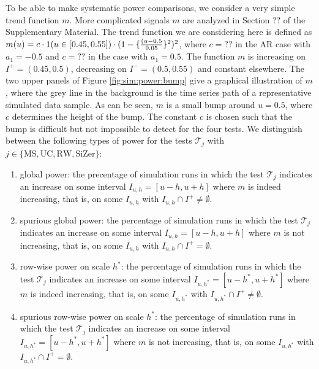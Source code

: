 To be able to make systematic power comparisons, we consider a very simple trend function $m$. More complicated signals $m$ are analyzed in Section ?? of the Supplementary Material. The trend function we are considering here is defined as $m(u) = c \cdot 1(u \in [0.45,0.55]) \cdot (1 - \{\frac{(u-0.5}{0.05}\}^2)^2$, where $c = ??$ in the AR case with $a_1 = -0.5$ and $c=??$ in the case with $a_1=0.5$. The function $m$ is increasing on $I^{+} = (0.45,0.5)$, decreasing on $I^{-} = (0.5,0.55)$ and constant elsewhere. The two upper panels of Figure \ref{fig:sim:power:bump} give a graphical illustration of $m$, where the grey line in the background is the time series path of a representative simulated data sample. As can be seen, $m$ is a small bump around $u=0.5$, where $c$ determines the height of the bump. The constant $c$ is chosen such that the bump is difficult but not impossible to detect for the four tests. We distinguish between the following types of power for the tests $\mathcal{T}_j$ with $j \in \{ \text{MS}, \text{UC}, \text{RW}, \text{SiZer} \}$: 
\begin{enumerate}[label=(\roman*),leftmargin=0.85cm]
\item global power: the precentage of simulation runs in which the test $\mathcal{T}_j$ indicates an increase on some interval $I_{u,h}=[u-h,u+h]$ where $m$ is indeed increasing, that is, on some $I_{u,h}$ with $I_{u,h} \cap I^+ \neq \emptyset$.
\item spurious global power: the percentage of simulation runs in which the test $\mathcal{T}_j$ indicates an increase on some interval $I_{u,h}=[u-h,u+h]$ where $m$ is not increasing, that is, on some $I_{u,h}$ with $I_{u,h} \cap I^+ = \emptyset$.
\item row-wise power on scale $h^*$: the percentage of simulation runs in which the test $\mathcal{T}_j$ indicates an increase on some interval $I_{u,h^*}=[u-h^*,u+h^*]$ where $m$ is indeed increasing, that is, on some $I_{u,h^*}$ with $I_{u,h^*} \cap I^+ \neq \emptyset$.
\item spurious row-wise power on scale $h^*$: the percentage of simulation runs in which the test $\mathcal{T}_j$ indicates an increase on some interval $I_{u,h^*}=[u-h^*,u+h^*]$ where $m$ is not increasing, that is, on some $I_{u,h^*}$ with $I_{u,h^*} \cap I^+ = \emptyset$.
\end{enumerate}


